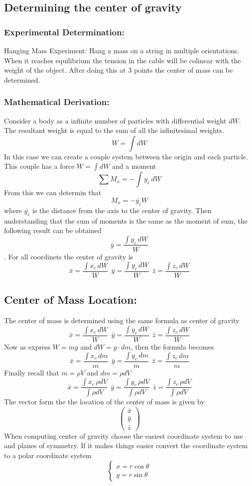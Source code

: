 \documentclass[14pt]{article}
\begin{document}
    \subsection{Determining the center of gravity}
    \subsubsection{Experimental Determination:}
    Hanging Mass Experiment: Hang a mass on a string in multiple orientations. When it reaches equilibrium the tension in the cable will be colinear with the weight of the object. After doing this at 3 points the center of mass can be determined.
    \subsubsection{Mathematical Derivation:}
    Consider a body as a infinite number of particles with differential weight $dW$. The resultant weight is equal to the sum of all the infinitesimal weights. $$W=\int dW$$
    In this case we can create a couple system between the origin and each particle.
    This couple has a force $W=\int dW$ and a moment $$\sum M_x=-\int y_c\, dW$$ From this we can determin that $$M_x=-\bar {y_c}W$$ where $\bar{y_c}$ is the distance from the axis to the center of gravity. Then understanding that the sum of moments is the same as the moment of sum, the following result can be obtained $$\bar y=\frac{\int y_c\, dW}{W}$$. For all coordinets the center of gravity is $$\bar x=\frac{\int x_c\, dW}{W}\ \  \bar y=\frac{\int y_c\, dW}{W}\ \ \bar z=\frac{\int z_c\, dW}{W}$$
    \subsection{Center of Mass Location:}
    The center of mass is determined using the same formula as center of gravity
    $$\bar x=\frac{\int x_c\, dW}{W}\ \  \bar y=\frac{\int y_c\, dW}{W}\ \ \bar z=\frac{\int z_c\, dW}{W}$$
    Now as express $W=mg$ and $dW=g\cdot dm$, then the formula becomes
    $$\bar x=\frac{\int x_c\, dm}{m}\ \  \bar y=\frac{\int y_c\, dm}{m}\ \ \bar z=\frac{\int z_c\, dm}{m}$$
    Finally recall that $m=\rho V$ and $dm=\rho dV$
    $$\bar x=\frac{\int x_c\, \rho dV}{\int \rho dV}\ \  \bar y=\frac{\int y_c\, \rho dV}{\int \rho dV}\ \ \bar z=\frac{\int z_c\, \rho dV}{\int \rho dV}$$
    The vector form the the location of the center of mass is given by $$\begin{pmatrix}
        \bar x\\ \bar y\\ \bar z
    \end{pmatrix}$$
    When computing center of gravity choose the easiest coordinate system to use and planes of symmetry.
    If it makes things easier convert the coordinate system to a polar coordinate system 
    $$\left\{\begin{array}{lr}
        x=r\cos\theta\\
        y=r\sin\theta
    \end{array}\right.
    $$
\end{document}

